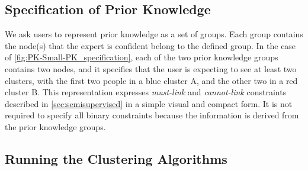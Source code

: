 \subsection{Specification of Prior Knowledge}

We ask users to represent prior knowledge as a set of groups. Each group contains the node(s) that the expert is confident belong to the defined group.
In the case of \autoref{fig:PK-Small-PK_specification}, each of the two prior knowledge groups contains two nodes, and it specifies that the user is expecting to see at least two clusters, with the first two people in a blue cluster A, and the other two in a red cluster B.
This representation expresses \emph{must-link} and \emph{cannot-link} constraints described in \autoref{sec:semisupervised} in a simple visual and compact form. It is not required to specify all binary constraints because the information is derived from the prior knowledge groups. %

\subsection{Running the Clustering Algorithms} \label{sub:families}

